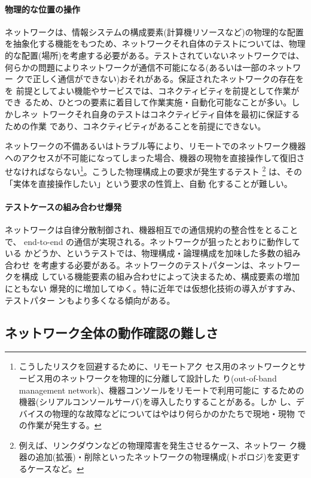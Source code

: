     \paragraph{物理的な位置の操作}
ネットワークは、情報システムの構成要素(計算機リソースなど)の物理的な配置
を抽象化する機能をもつため、ネットワークそれ自体のテストについては、物理
的な配置(場所)を考慮する必要がある。テストされていないネットワークでは、
何らかの問題によりネットワークが通信不可能になる(あるいは一部のネットワー
クで正しく通信ができない)おそれがある。保証されたネットワークの存在をを
前提としてよい機能やサービスでは、コネクティビティを前提として作業ができ
るため、ひとつの要素に着目して作業実施・自動化可能なことが多い。しかしネッ
トワークそれ自身のテストはコネクティビティ自体を最初に保証するための作業
であり、コネクティビティがあることを前提にできない。

ネットワークの不備あるいはトラブル等により、リモートでのネットワーク機器
へのアクセスが不可能になってしまった場合、機器の現物を直接操作して復旧さ
せなければならない\footnote{こうしたリスクを回避するために、リモートアク
セス用のネットワークとサービス用のネットワークを物理的に分離して設計した
り(out-of-band management network)、機器コンソールをリモートで利用可能に
するための機器(シリアルコンソールサーバ)を導入したりすることがある。しか
し、デバイスの物理的な故障などについてはやはり何らかのかたちで現地・現物
での作業が発生する。}。こうした物理構成上の要求が発生するテスト
\footnote{例えば、リンクダウンなどの物理障害を発生させるケース、ネットワー
ク機器の追加(拡張)・削除といったネットワークの物理構成(トポロジ)を変更す
るケースなど。} は、その「実体を直接操作したい」という要求の性質上、自動
化することが難しい。

    \paragraph{テストケースの組み合わせ爆発}
ネットワークは自律分散制御され、機器相互での通信規約の整合性をとることで、
end-to-end の通信が実現される。ネットワークが狙ったとおりに動作している
かどうか、というテストでは、物理構成・論理構成を加味した多数の組み合わせ
を考慮する必要がある。ネットワークのテストパターンは、ネットワークを構成
している機能要素の組み合わせによって決まるため、構成要素の増加にともない
爆発的に増加してゆく。特に近年では仮想化技術の導入がすすみ、テストパター
ンもより多くなる傾向がある。

  \subsection{ネットワーク全体の動作確認の難しさ}

